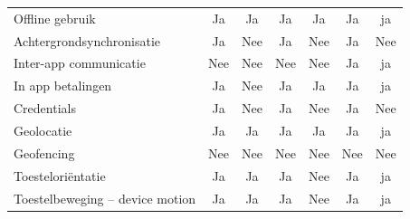  		\begin{table}[]
 			\centering
 			\begin{tabular}{p{6cm}cccccc}
			   
			   Offline gebruik & \cellcolor{green!40} Ja  & \cellcolor{green!40} Ja & \cellcolor{green!40} Ja  & \cellcolor{green!40} Ja & \cellcolor{green!40} Ja & \cellcolor{green!40} ja \\
			   
			   Achtergrondsynchronisatie & \cellcolor{green!40} Ja  &  \cellcolor{red!50} Nee& \cellcolor{green!40} Ja  &  \cellcolor{red!50} Nee& \cellcolor{green!40} Ja & \cellcolor{red!50} Nee \\
			   
			   Inter-app communicatie & \cellcolor{red!50} Nee  &  \cellcolor{red!50} Nee& \cellcolor{red!50} Nee  &  \cellcolor{red!50} Nee& \cellcolor{green!40} Ja & \cellcolor{green!40} ja \\
			   
			   In app betalingen & \cellcolor{green!40} Ja  &\cellcolor{red!50} Nee & \cellcolor{green!40} Ja  & \cellcolor{green!40} Ja & \cellcolor{green!40} Ja & \cellcolor{green!40} ja \\
			   
			   Credentials & \cellcolor{green!40} Ja  & \cellcolor{red!50} Nee & \cellcolor{green!40} Ja  & \cellcolor{red!50} Nee & \cellcolor{green!40} Ja & \cellcolor{red!50} Nee \\
			   
			   Geolocatie & \cellcolor{green!40} Ja  & \cellcolor{green!40} Ja & \cellcolor{green!40} Ja  & \cellcolor{green!40} Ja & \cellcolor{green!40} Ja & \cellcolor{green!40} ja \\
			   
			   Geofencing &  \cellcolor{red!50} Nee  &  \cellcolor{red!50} Nee &  \cellcolor{red!50} Nee  & \cellcolor{red!50} Nee &  \cellcolor{red!50} Nee &  \cellcolor{red!50} Nee \\
			   
			   Toesteloriëntatie & \cellcolor{green!40} Ja  & \cellcolor{green!40} Ja & \cellcolor{green!40} Ja  & \cellcolor{red!50} Nee& \cellcolor{green!40} Ja & \cellcolor{green!40} ja \\
			   
			   Toestelbeweging – device motion & \cellcolor{green!40} Ja  & \cellcolor{green!40} Ja & \cellcolor{green!40} Ja  & \cellcolor{red!50} Nee& \cellcolor{green!40} Ja & \cellcolor{green!40} ja \\
			   

\end{tabular}
\end{table}

